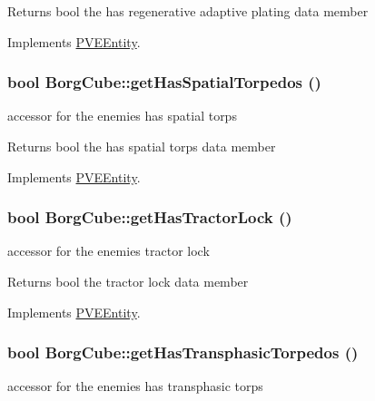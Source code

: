 \begin{DoxyReturn}{Returns}
bool the has regenerative adaptive plating data member 
\end{DoxyReturn}


Implements \hyperlink{classPVEEntity}{PVEEntity}.

\hypertarget{classBorgCube_afdc5573e2b59fd647f4b2ddb67913c43}{
\subsubsection[{getHasSpatialTorpedos}]{\setlength{\rightskip}{0pt plus 5cm}bool BorgCube::getHasSpatialTorpedos ()}}
\label{d2/d93/classBorgCube_afdc5573e2b59fd647f4b2ddb67913c43}
accessor for the enemies has spatial torps

\begin{DoxyReturn}{Returns}
bool the has spatial torps data member 
\end{DoxyReturn}


Implements \hyperlink{classPVEEntity}{PVEEntity}.

\hypertarget{classBorgCube_a9090916676b96c967245603216470be6}{
\subsubsection[{getHasTractorLock}]{\setlength{\rightskip}{0pt plus 5cm}bool BorgCube::getHasTractorLock ()}}
\label{d2/d93/classBorgCube_a9090916676b96c967245603216470be6}
accessor for the enemies tractor lock

\begin{DoxyReturn}{Returns}
bool the tractor lock data member 
\end{DoxyReturn}


Implements \hyperlink{classPVEEntity}{PVEEntity}.

\hypertarget{classBorgCube_a043284f5d42efc224320284a74270836}{
\subsubsection[{getHasTransphasicTorpedos}]{\setlength{\rightskip}{0pt plus 5cm}bool BorgCube::getHasTransphasicTorpedos ()}}
\label{d2/d93/classBorgCube_a043284f5d42efc224320284a74270836}
accessor for the enemies has transphasic torps

